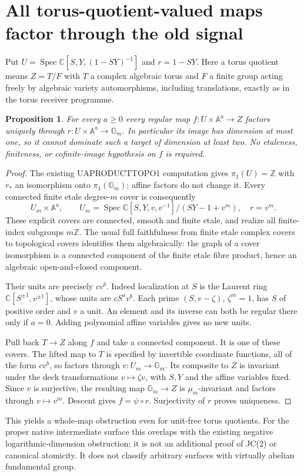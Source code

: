 \documentclass[11pt]{article}
\newtheorem{proposition}{Proposition}
\newcommand{\C}{\mathbb C}
\newcommand{\Gm}{\mathbb G_m}
\begin{document}
\section{All torus-quotient-valued maps factor through the old signal}
Put $U=\operatorname{Spec}\C[S,Y,(1-SY)^{-1}]$ and $r=1-SY$.
Here a torus quotient means $Z=T/F$ with $T$ a complex algebraic torus and
$F$ a finite group acting freely by algebraic variety automorphisms,
including translations, exactly as in the torus receiver programme.
\begin{proposition}
For every $a\ge0$ every regular map $f:U\times\mathbb A^a\longrightarrow Z$
factors uniquely through $r:U\times\mathbb A^a\longrightarrow\Gm$.
In particular its image has dimension at most one, so it cannot dominate
such a target of dimension at least two. No etaleness, finiteness, or
cofinite-image hypothesis on $f$ is required.
\end{proposition}
\begin{proof}
The existing UAPRODUCTTOPO1 computation gives $\pi_1(U)=\mathbb Z$ with
$r_*$ an isomorphism onto $\pi_1(\Gm)$; affine factors do not change it.
Every connected finite etale degree-$m$ cover is consequently
\[
 U_m\times\mathbb A^a,\qquad
 U_m=\operatorname{Spec}\C[S,Y,v,v^{-1}]/(SY-1+v^m),\quad r=v^m.
\]
These explicit covers are connected, smooth and finite etale, and realize
all finite-index subgroups $m\mathbb Z$. The usual full faithfulness from
finite etale complex covers to topological covers identifies them
algebraically: the graph of a cover isomorphism is a connected component
of the finite etale fibre product, hence an algebraic open-and-closed
component.

Their units are precisely $c v^b$. Indeed localization at $S$ is the
Laurent ring $\C[S^{\pm1},v^{\pm1}]$, whose units are $cS^a v^b$.
Each prime $(S,v-\zeta)$, $\zeta^m=1$, has $S$ of positive order and $v$ a
unit. An element and its inverse can both be regular there only if $a=0$.
Adding polynomial affine variables gives no new units.

Pull back $T\to Z$ along $f$ and take a connected component. It is one of
these covers. The lifted map to $T$ is specified by invertible coordinate
functions, all of the form $cv^b$, so factors through $v:U_m\to\Gm$.
Its composite to $Z$ is invariant under the deck transformations
$v\mapsto\zeta v$, with $S,Y$ and the affine variables fixed. Since $v$ is
surjective, the resulting map $\Gm\to Z$ is $\mu_m$-invariant and factors
through $v\mapsto v^m$. Descent gives $f=\psi\circ r$. Surjectivity of $r$
proves uniqueness.
\end{proof}
This yields a whole-map obstruction even for unit-free torus quotients.
For the proper native intermediate surface this overlaps with the existing
negative logarithmic-dimension obstruction; it is not an additional proof
of JC(2) or canonical atomicity. It does not classify arbitrary surfaces
with virtually abelian fundamental group.
\end{document}
